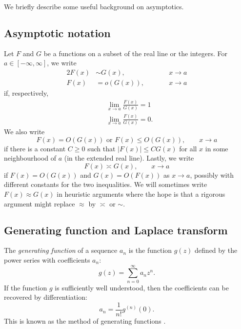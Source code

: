 We briefly describe some useful background on asymptotics.


\subsection{Asymptotic notation}

Let $F$ and $G$ be a functions on a subset of the real line or the integers.
For $a\in[-\infty,\infty]$, we write
\begin{alignat}{2}
F(x) &\sim G(x), &&\qquad x \to a \\
F(x) &= o(G(x)), &&\qquad x \to a
\end{alignat}
if, respectively,
\begin{align}
&\lim_{x\to a} \frac{F(x)}{G(x)} = 1 \\
&\lim_{x\to a} \frac{F(x)}{G(x)} = 0.
\end{align}
We also write
\begin{equation}
F(x) = O(G(x))
	\text{ or }
F(x) \le O(G(x)),
	\qquad
x \to a
\end{equation}
if there is a constant $C \ge 0$ such that $|F(x)| \le C G(x)$ for all
$x$ in some neighbourhood of $a$ (in the extended real line). Lastly, we write
\begin{equation}
F(x) \asymp G(x),
	\qquad
x \to a
\end{equation}
if $F(x) = O(G(x))$ and $G(x) = O(F(x))$ as $x\to a$, possibly with
different constants for the two inequalities. We will sometimes write
$F(x) \approx G(x)$ in heuristic
arguments where the hope is that a rigorous argument might replace $\approx$
by $\asymp$ or $\sim$.


\subsection{Generating function and Laplace transform}

The \emph{generating function} of a sequence $a_n$ is the function $g(z)$ defined
by the power series with coefficients $a_n$:
\begin{equation}
g(z) = \sum_{n=0}^\infty a_n z^n.
\end{equation}
If the function $g$ is sufficiently well understood, then the coefficients
can be recovered by differentiation:
\begin{equation}
a_n = \frac{1}{n!} g^{(n)}(0).
\end{equation}
This is known as the method of generating functions \cite{Wilf06}.

